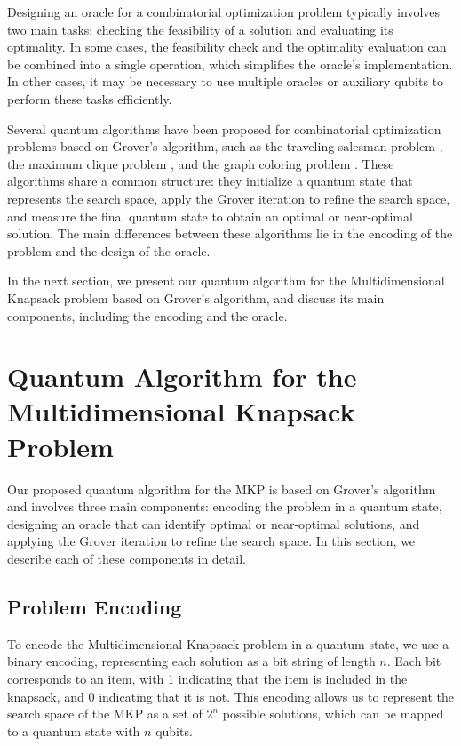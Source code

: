 Designing an oracle for a combinatorial optimization problem typically involves two main tasks: checking the feasibility of a solution and evaluating its optimality. In some cases, the feasibility check and the optimality evaluation can be combined into a single operation, which simplifies the oracle's implementation. In other cases, it may be necessary to use multiple oracles or auxiliary qubits to perform these tasks efficiently.

Several quantum algorithms have been proposed for combinatorial optimization problems based on Grover's algorithm, such as the traveling salesman problem \cite{zalka1999}, the maximum clique problem \cite{childs2017}, and the graph coloring problem \cite{daskin2020}. These algorithms share a common structure: they initialize a quantum state that represents the search space, apply the Grover iteration to refine the search space, and measure the final quantum state to obtain an optimal or near-optimal solution. The main differences between these algorithms lie in the encoding of the problem and the design of the oracle.

In the next section, we present our quantum algorithm for the Multidimensional Knapsack problem based on Grover's algorithm, and discuss its main components, including the encoding and the oracle.

\section{Quantum Algorithm for the Multidimensional Knapsack Problem}
\label{sec:algorithm}

Our proposed quantum algorithm for the MKP is based on Grover's algorithm and involves three main components: encoding the problem in a quantum state, designing an oracle that can identify optimal or near-optimal solutions, and applying the Grover iteration to refine the search space. In this section, we describe each of these components in detail.

\subsection{Problem Encoding}
\label{subsec:encoding}
To encode the Multidimensional Knapsack problem in a quantum state, we use a binary encoding, representing each solution as a bit string of length $n$. Each bit corresponds to an item, with 1 indicating that the item is included in the knapsack, and 0 indicating that it is not. This encoding allows us to represent the search space of the MKP as a set of $2^n$ possible solutions, which can be mapped to a quantum state with $n$ qubits.

